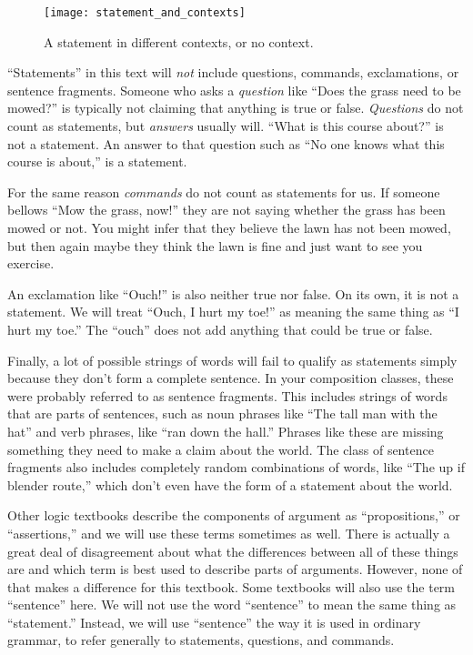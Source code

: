 \begin{figure*}
\texttt{[image: statement\_and\_contexts]}
\caption{A statement in different contexts, or no context.}
\label{fig:statements_and_context}
\end{figure*}


``Statements'' in this text will \emph{not} include questions, commands, exclamations, or sentence fragments. Someone who asks a \emph{question} like ``Does the grass need to be mowed?'' is typically not claiming that anything is true or false. \emph{Questions} do not count as statements, but \emph{answers} usually will. ``What is this course about?'' is not a statement. An answer to that question such as ``No one knows what this course is about,'' is a statement.

For the same reason \emph{commands} do not count as statements for us. If someone bellows ``Mow the grass, now!'' they are not saying whether the grass has been mowed or not. You might infer that they believe the lawn has not been mowed, but then again maybe they think the lawn is fine and just want to see you exercise.

An exclamation like ``Ouch!'' is also neither true nor false. On its own, it is not a statement. We will treat ``Ouch, I hurt my toe!'' as meaning the same thing as ``I hurt my toe.'' The ``ouch'' does not add anything that could be true or false.

Finally, a lot of possible strings of words will fail to qualify as statements simply because they don't form a complete sentence. In your composition classes, these were probably referred to as sentence fragments. This includes strings of words that are parts of sentences, such as noun phrases like ``The tall man with the hat'' and verb phrases, like ``ran down the hall.'' Phrases like these are missing something they need to make a claim about the world. The class of sentence fragments also includes completely random combinations of words, like ``The up if blender route,'' which don't even have the form of a statement about the world.

Other logic textbooks describe the components of argument as ``propositions,'' or ``assertions,'' and we will use these terms sometimes as well.  There is actually a great deal of disagreement about what the differences between all of these things are and which term is best used to describe parts of arguments. However, none of that makes a difference for this textbook. Some textbooks will also use the term ``sentence'' here. We will not use the word ``sentence'' to mean the same thing as ``statement.'' Instead, we will use ``sentence'' the way it is used in ordinary grammar, to refer generally to statements, questions, and commands.

